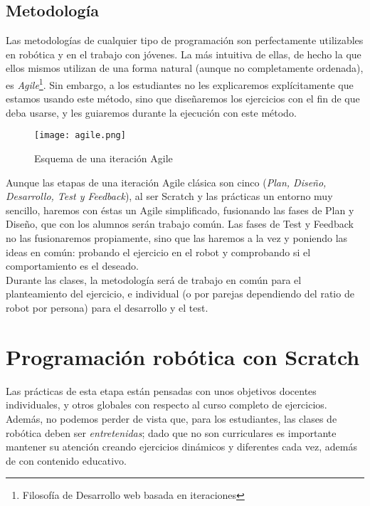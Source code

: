 \subsection{Metodología}\label{subsec:metodología}
Las metodologías de cualquier tipo de programación son perfectamente utilizables en robótica y en el trabajo con jóvenes. La más intuitiva de ellas, de hecho la que ellos mismos utilizan de una forma natural (aunque no completamente ordenada), es \textit{Agile}\footnote{Filosofía de Desarrollo web basada en iteraciones}. Sin embargo, a los estudiantes no les explicaremos explícitamente que estamos usando este método, sino que diseñaremos los ejercicios con el fin de que deba usarse, y les guiaremos durante la ejecución con este método. 
\begin{figure}[h]
	\centering
	\texttt{[image: agile.png]}
	\label{img:agile}
	\caption{Esquema de una iteración Agile}
\end{figure}
Aunque las etapas de una iteración Agile clásica son cinco (\textit{Plan, Diseño, Desarrollo, Test y Feedback}), al ser Scratch y las prácticas un entorno muy sencillo, haremos con éstas un Agile simplificado, fusionando las fases de Plan y Diseño, que con los alumnos serán trabajo común. Las fases de Test y Feedback no las fusionaremos propiamente, sino que las haremos a la vez y poniendo las ideas en común: probando el ejercicio en el robot y comprobando si el comportamiento es el deseado. \\
Durante las clases, la metodología será de trabajo en común para el planteamiento del ejercicio, e individual (o por parejas dependiendo del ratio de robot por persona) para el desarrollo y el test.

\section{Programación robótica con Scratch}\label{sec:scratch}
Las prácticas de esta etapa están pensadas con unos objetivos docentes individuales, y otros globales con respecto al curso completo de ejercicios. Además, no podemos perder de vista que, para los estudiantes, las clases de robótica deben ser \textit{entretenidas}; dado que no son curriculares es importante mantener su atención creando ejercicios dinámicos y diferentes cada vez, además de con contenido educativo. 
